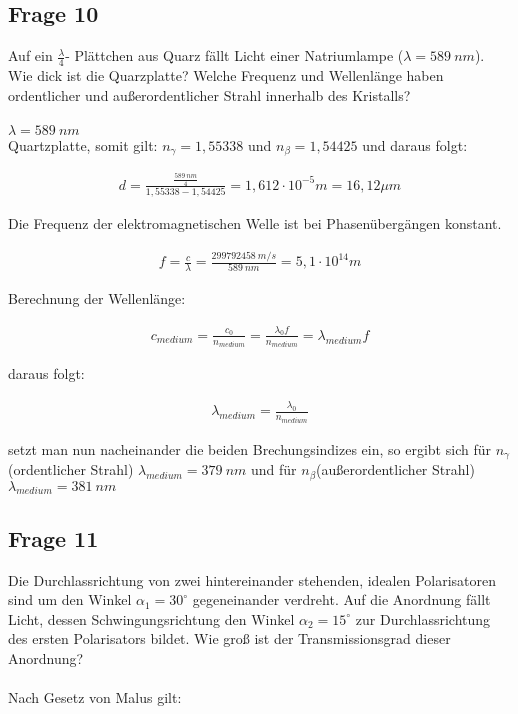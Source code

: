 \documentclass[a4paper,10pt]{scrartcl}
\begin{document}
	    \subsection{Frage 10}
	    	Auf ein \(\frac{\lambda}{4}\)- Plättchen aus Quarz fällt Licht einer Natriumlampe (\(\lambda=\SI{589}{nm}\)). Wie dick ist
	    	die Quarzplatte? Welche Frequenz und Wellenlänge haben ordentlicher und außerordentlicher
	    	Strahl innerhalb des Kristalls?\\
	    	\\
	    	\(\lambda=\SI{589}{nm}\)\\
	    	Quartzplatte, somit gilt: \(n_{\gamma}=1,55338\) und \(n_{\beta}=1,54425\) und daraus folgt:
	    	
	    	\begin{align*}
	    	d=\frac{\frac{\SI{589}{nm}}{4}}{1,55338-1,54425}=1,612\cdot 10^{-5}m=16,12\mu m
	    	\end{align*}
	    	
	    	Die Frequenz der elektromagnetischen Welle ist bei Phasenübergängen konstant.
	    	
	    	\begin{align*}
	    	f=\frac{c}{\lambda}=\frac{\SI{299792458}{m/s}}{\SI{589}{nm}}=5,1\cdot 10^{14}m
	    	\end{align*}
	    	
	    	Berechnung der Wellenlänge:
	    	
	    	\begin{align*}
	    	c_{medium}=\frac{c_{0}}{n_{medium}}=\frac{\lambda_{0}f}{n_{medium}}=\lambda_{medium}f
	    	\end{align*}
	    	
	    	daraus folgt:
	    	
	    	\begin{align*}
	    	\lambda_{medium}=\frac{\lambda_{0}}{n_{medium}}
	    	\end{align*}
	    	
	    	setzt man nun nacheinander die beiden Brechungsindizes ein, so ergibt sich für \(n_{\gamma}\)(ordentlicher Strahl) \(\lambda_{medium}=\SI{379}{nm}\) und für \(n_{\beta}\)(außerordentlicher Strahl) \(\lambda_{medium}=\SI{381}{nm}\)
	    	
	    \subsection{Frage 11}
	    	Die Durchlassrichtung von zwei hintereinander stehenden, idealen Polarisatoren sind um den
	    	Winkel \(\alpha_{1}=30^{\circ}\) gegeneinander verdreht. Auf die Anordnung fällt Licht, dessen Schwingungsrichtung
	    	den Winkel \(\alpha_{2}=15^{\circ}\) zur Durchlassrichtung des ersten Polarisators bildet. Wie groß
	    	ist der Transmissionsgrad dieser Anordnung?\\
	    	\\
	    	Nach Gesetz von Malus gilt:
	    	
\end{document}

